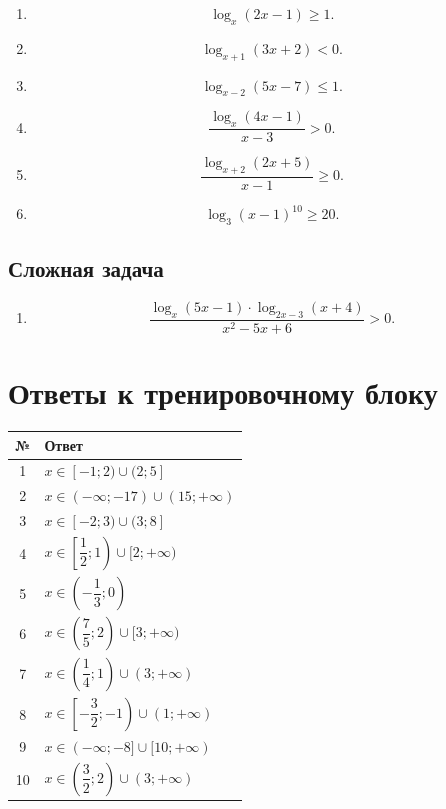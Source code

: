 \documentclass[a4paper,12pt]{article}
\begin{document}
\begin{enumerate}[resume]
  \item
  \[
  \log_{x}(2x-1)\ge1.
  \]

  \item
  \[
  \log_{x+1}(3x+2)<0.
  \]

  \item
  \[
  \log_{x-2}(5x-7)\le1.
  \]

  \item
  \[
  \frac{\log_x(4x-1)}{x-3}>0.
  \]

  \item
  \[
  \frac{\log_{x+2}(2x+5)}{x-1}\ge0.
  \]

  \item
  \[
  \log_3(x-1)^{10}\ge20.
  \]
\end{enumerate}

\subsection*{Сложная задача}

\begin{enumerate}[resume]
  \item
  \[
  \frac{\log_x(5x-1)\cdot\log_{2x-3}(x+4)}{x^2-5x+6}>0.
  \]
\end{enumerate}

\newpage

\section*{Ответы к тренировочному блоку}

\begin{center}
\renewcommand{\arraystretch}{1.45}
\begin{tabularx}{\linewidth}{@{}cX@{}}
\toprule
\textbf{№} & \textbf{Ответ} \\
\midrule
1 & \(x\in[-1;2)\cup(2;5]\) \\
2 & \(x\in(-\infty;-17)\cup(15;+\infty)\) \\
3 & \(x\in[-2;3)\cup(3;8]\) \\
4 & \(x\in\left[\dfrac12;1\right)\cup[2;+\infty)\) \\
5 & \(x\in\left(-\dfrac13;0\right)\) \\
6 & \(x\in\left(\dfrac75;2\right)\cup[3;+\infty)\) \\
7 & \(x\in\left(\dfrac14;1\right)\cup(3;+\infty)\) \\
8 & \(x\in\left[-\dfrac32;-1\right)\cup(1;+\infty)\) \\
9 & \(x\in(-\infty;-8]\cup[10;+\infty)\) \\
10 & \(x\in\left(\dfrac32;2\right)\cup\left(3;+\infty\right)\) \\
\bottomrule
\end{tabularx}
\end{center}
\end{document}
